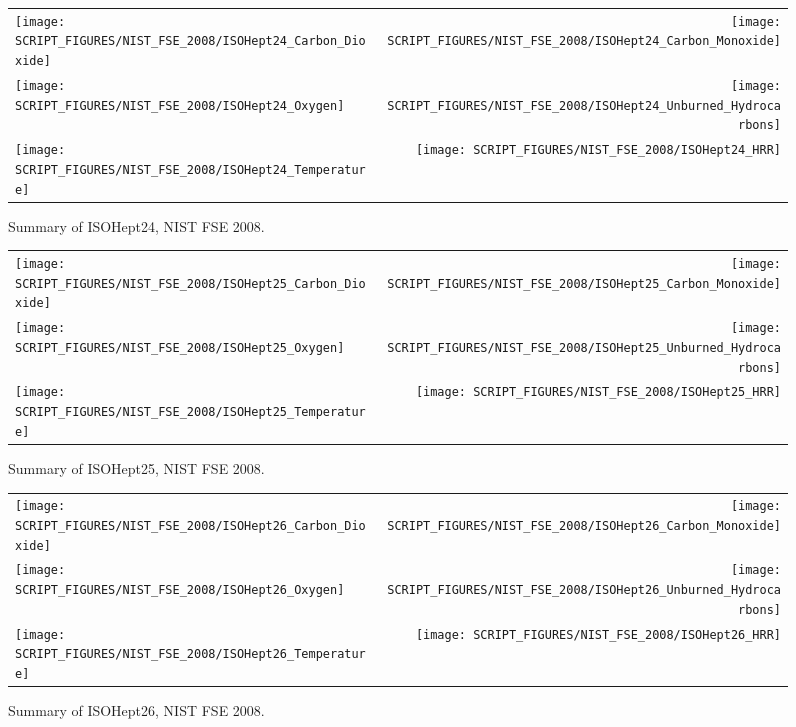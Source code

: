 \begin{figure}[h]
\begin{tabular*}{\textwidth}{l@{\extracolsep{\fill}}r}
\texttt{[image: SCRIPT\_FIGURES/NIST\_FSE\_2008/ISOHept24\_Carbon\_Dioxide]} &
\texttt{[image: SCRIPT\_FIGURES/NIST\_FSE\_2008/ISOHept24\_Carbon\_Monoxide]} \\
\texttt{[image: SCRIPT\_FIGURES/NIST\_FSE\_2008/ISOHept24\_Oxygen]} &
\texttt{[image: SCRIPT\_FIGURES/NIST\_FSE\_2008/ISOHept24\_Unburned\_Hydrocarbons]} \\
\texttt{[image: SCRIPT\_FIGURES/NIST\_FSE\_2008/ISOHept24\_Temperature]} &
\texttt{[image: SCRIPT\_FIGURES/NIST\_FSE\_2008/ISOHept24\_HRR]}
\end{tabular*}
\caption[Summary of ISOHept24, NIST FSE 2008]{Summary of ISOHept24, NIST FSE 2008.}
\label{NIST_FSE_1994_ISOHept24}
\end{figure}

\begin{figure}[h]
\begin{tabular*}{\textwidth}{l@{\extracolsep{\fill}}r}
\texttt{[image: SCRIPT\_FIGURES/NIST\_FSE\_2008/ISOHept25\_Carbon\_Dioxide]} &
\texttt{[image: SCRIPT\_FIGURES/NIST\_FSE\_2008/ISOHept25\_Carbon\_Monoxide]} \\
\texttt{[image: SCRIPT\_FIGURES/NIST\_FSE\_2008/ISOHept25\_Oxygen]} &
\texttt{[image: SCRIPT\_FIGURES/NIST\_FSE\_2008/ISOHept25\_Unburned\_Hydrocarbons]} \\
\texttt{[image: SCRIPT\_FIGURES/NIST\_FSE\_2008/ISOHept25\_Temperature]} &
\texttt{[image: SCRIPT\_FIGURES/NIST\_FSE\_2008/ISOHept25\_HRR]}
\end{tabular*}
\caption[Summary of ISOHept25, NIST FSE 2008]{Summary of ISOHept25, NIST FSE 2008.}
\label{NIST_FSE_1994_ISOHept25}
\end{figure}

\begin{figure}[h]
\begin{tabular*}{\textwidth}{l@{\extracolsep{\fill}}r}
\texttt{[image: SCRIPT\_FIGURES/NIST\_FSE\_2008/ISOHept26\_Carbon\_Dioxide]} &
\texttt{[image: SCRIPT\_FIGURES/NIST\_FSE\_2008/ISOHept26\_Carbon\_Monoxide]} \\
\texttt{[image: SCRIPT\_FIGURES/NIST\_FSE\_2008/ISOHept26\_Oxygen]} &
\texttt{[image: SCRIPT\_FIGURES/NIST\_FSE\_2008/ISOHept26\_Unburned\_Hydrocarbons]} \\
\texttt{[image: SCRIPT\_FIGURES/NIST\_FSE\_2008/ISOHept26\_Temperature]} &
\texttt{[image: SCRIPT\_FIGURES/NIST\_FSE\_2008/ISOHept26\_HRR]}
\end{tabular*}
\caption[Summary of ISOHept26, NIST FSE 2008]{Summary of ISOHept26, NIST FSE 2008.}
\label{NIST_FSE_1994_ISOHept26}
\end{figure}

